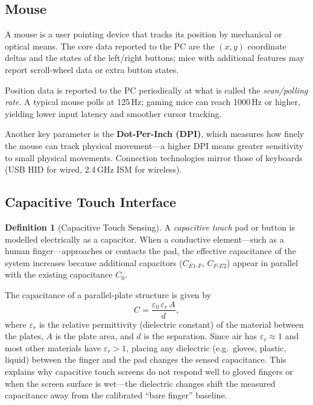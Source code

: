 \documentclass[11pt, a4paper, notitlepage]{report}
\theoremstyle{definition}
\newtheorem{definition}[theorem]{Definition}
\theoremstyle{remark}
\theoremstyle{definition}
\begin{document}
\subsection{Mouse}
\label{sec:mouse}

A mouse is a user pointing device that tracks its position by mechanical or optical means. The core data reported to the PC are the $(x,y)$ coordinate deltas and the states of the left/right buttons; mice with additional features may report scroll-wheel data or extra button states.

Position data is reported to the PC periodically at what is called the \emph{scan/polling rate}. A typical mouse polls at 125\,Hz; gaming mice can reach 1000\,Hz or higher, yielding lower input latency and smoother cursor tracking.

Another key parameter is the \textbf{Dot-Per-Inch (DPI)}, which measures how finely the mouse can track physical movement---a higher DPI means greater sensitivity to small physical movements. Connection technologies mirror those of keyboards (USB HID for wired, 2.4\,GHz ISM for wireless).

\subsection{Capacitive Touch Interface}
\label{sec:capacitive-touch}

\begin{definition}[Capacitive Touch Sensing]
  \label{def:capacitive-touch}
  A \emph{capacitive touch} pad or button is modelled electrically as a capacitor. When a conductive element---such as a human finger---approaches or contacts the pad, the effective capacitance of the system increases because additional capacitors ($C_{E1\text{-}F}$, $C_{F\text{-}E2}$) appear in parallel with the existing capacitance $C_0$.
\end{definition}

The capacitance of a parallel-plate structure is given by
\[
  C = \frac{\varepsilon_0 \,\varepsilon_r \, A}{d},
\]
where $\varepsilon_r$ is the relative permittivity (dielectric constant) of the material between the plates, $A$ is the plate area, and $d$ is the separation. Since air has $\varepsilon_r \approx 1$ and most other materials have $\varepsilon_r > 1$, placing any dielectric (e.g.\ gloves, plastic, liquid) between the finger and the pad changes the sensed capacitance. This explains why capacitive touch screens do not respond well to gloved fingers or when the screen surface is wet---the dielectric changes shift the measured capacitance away from the calibrated ``bare finger'' baseline.
\end{document}
